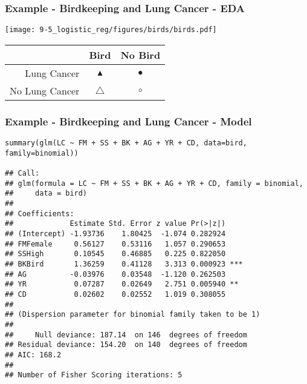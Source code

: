 \begin{frame}
\frametitle{Example - Birdkeeping and Lung Cancer - EDA}

\begin{center}
\texttt{[image: 9-5\_logistic\_reg/figures/birds/birds.pdf]}
\end{center}

{\scriptsize
\begin{center}
\begin{tabular}{r|cc}
               & Bird             & No Bird \\
\hline               
Lung Cancer    & \textcolor{oiG}{$\blacktriangle$} & \textcolor{oiG}{$\bullet$} \\
No Lung Cancer & \textcolor{oiB}{$\triangle$}      & \textcolor{oiB}{$\circ$}
\end{tabular}
\end{center}
}

 
 
\end{frame}


\begin{frame}[fragile]
\frametitle{Example - Birdkeeping and Lung Cancer - Model}

\vspace{-5mm}

{\tiny
\begin{verbatim}
summary(glm(LC ~ FM + SS + BK + AG + YR + CD, data=bird, family=binomial))

## Call:
## glm(formula = LC ~ FM + SS + BK + AG + YR + CD, family = binomial, 
##     data = bird)
## 
## Coefficients:
##             Estimate Std. Error z value Pr(>|z|)    
## (Intercept) -1.93736    1.80425  -1.074 0.282924    
## FMFemale     0.56127    0.53116   1.057 0.290653    
## SSHigh       0.10545    0.46885   0.225 0.822050    
## BKBird       1.36259    0.41128   3.313 0.000923 ***
## AG          -0.03976    0.03548  -1.120 0.262503    
## YR           0.07287    0.02649   2.751 0.005940 ** 
## CD           0.02602    0.02552   1.019 0.308055    
## 
## (Dispersion parameter for binomial family taken to be 1)
## 
##     Null deviance: 187.14  on 146  degrees of freedom
## Residual deviance: 154.20  on 140  degrees of freedom
## AIC: 168.2
## 
## Number of Fisher Scoring iterations: 5
\end{verbatim}
}

\end{frame}

